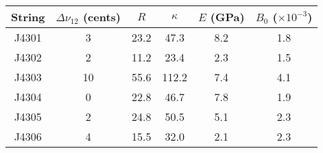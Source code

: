 \begin{tabular}{cccccc}
\toprule
String &  $\Delta \nu_{12}$ (cents) &  $R$ &  $\kappa$ &  $E$ (GPa) &  $B_0$ ($\times 10^{-3}$) \\
\midrule
 J4301 &                          3 & 23.2 &      47.3 &        8.2 &                       1.8 \\
 J4302 &                          2 & 11.2 &      23.4 &        2.3 &                       1.5 \\
 J4303 &                         10 & 55.6 &     112.2 &        7.4 &                       4.1 \\
 J4304 &                          0 & 22.8 &      46.7 &        7.8 &                       1.9 \\
 J4305 &                          2 & 24.8 &      50.5 &        5.1 &                       2.3 \\
 J4306 &                          4 & 15.5 &      32.0 &        2.1 &                       2.3 \\
\bottomrule
\end{tabular}

